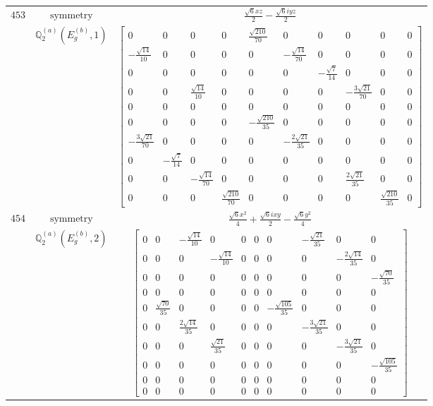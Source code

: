 \documentclass[fleqn,8pt,landscape]{jsarticle}
\begin{document}
\begin{longtable}{ccc}
$ 453 $ & $ \text{symmetry} $ & $ \frac{\sqrt{6} x z}{2} - \frac{\sqrt{6} i y z}{2} $ \\
$  $ & $ \mathbb{Q}_{2}^{(a)}(E_{g}^{(b)},1) $ & $ \begin{bmatrix} 0 & 0 & 0 & 0 & \frac{\sqrt{210}}{70} & 0 & 0 & 0 & 0 & 0 \\ - \frac{\sqrt{14}}{10} & 0 & 0 & 0 & 0 & - \frac{\sqrt{14}}{70} & 0 & 0 & 0 & 0 \\ 0 & 0 & 0 & 0 & 0 & 0 & - \frac{\sqrt{7}}{14} & 0 & 0 & 0 \\ 0 & 0 & \frac{\sqrt{14}}{10} & 0 & 0 & 0 & 0 & - \frac{3 \sqrt{21}}{70} & 0 & 0 \\ 0 & 0 & 0 & 0 & 0 & 0 & 0 & 0 & 0 & 0 \\ 0 & 0 & 0 & 0 & - \frac{\sqrt{210}}{35} & 0 & 0 & 0 & 0 & 0 \\ - \frac{3 \sqrt{21}}{70} & 0 & 0 & 0 & 0 & - \frac{2 \sqrt{21}}{35} & 0 & 0 & 0 & 0 \\ 0 & - \frac{\sqrt{7}}{14} & 0 & 0 & 0 & 0 & 0 & 0 & 0 & 0 \\ 0 & 0 & - \frac{\sqrt{14}}{70} & 0 & 0 & 0 & 0 & \frac{2 \sqrt{21}}{35} & 0 & 0 \\ 0 & 0 & 0 & \frac{\sqrt{210}}{70} & 0 & 0 & 0 & 0 & \frac{\sqrt{210}}{35} & 0 \end{bmatrix} $ \\ \hline
$ 454 $ & $ \text{symmetry} $ & $ \frac{\sqrt{6} x^{2}}{4} + \frac{\sqrt{6} i x y}{2} - \frac{\sqrt{6} y^{2}}{4} $ \\
$  $ & $ \mathbb{Q}_{2}^{(a)}(E_{g}^{(b)},2) $ & $ \begin{bmatrix} 0 & 0 & - \frac{\sqrt{14}}{10} & 0 & 0 & 0 & 0 & - \frac{\sqrt{21}}{35} & 0 & 0 \\ 0 & 0 & 0 & - \frac{\sqrt{14}}{10} & 0 & 0 & 0 & 0 & - \frac{2 \sqrt{14}}{35} & 0 \\ 0 & 0 & 0 & 0 & 0 & 0 & 0 & 0 & 0 & - \frac{\sqrt{70}}{35} \\ 0 & 0 & 0 & 0 & 0 & 0 & 0 & 0 & 0 & 0 \\ 0 & \frac{\sqrt{70}}{35} & 0 & 0 & 0 & 0 & - \frac{\sqrt{105}}{35} & 0 & 0 & 0 \\ 0 & 0 & \frac{2 \sqrt{14}}{35} & 0 & 0 & 0 & 0 & - \frac{3 \sqrt{21}}{35} & 0 & 0 \\ 0 & 0 & 0 & \frac{\sqrt{21}}{35} & 0 & 0 & 0 & 0 & - \frac{3 \sqrt{21}}{35} & 0 \\ 0 & 0 & 0 & 0 & 0 & 0 & 0 & 0 & 0 & - \frac{\sqrt{105}}{35} \\ 0 & 0 & 0 & 0 & 0 & 0 & 0 & 0 & 0 & 0 \\ 0 & 0 & 0 & 0 & 0 & 0 & 0 & 0 & 0 & 0 \end{bmatrix} $ \\ \hline

\end{longtable}
\end{document}
